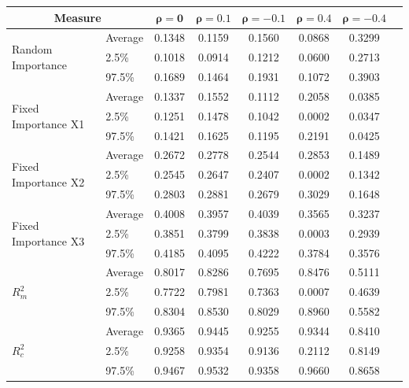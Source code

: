 \begin{table}[H]
  \centering
  \begin{tabular}{@{}llcccccc@{}}
    \toprule
    \multicolumn{2}{c}{\textbf{Measure}} & $\mathbf{\rho=0}$ & $\mathbf{\rho=0.1}$ & $\mathbf{\rho=-0.1}$ & $\mathbf{\rho=0.4}$ & $\mathbf{\rho=-0.4}$ \\ \midrule
    \multirow{3}{*}{Random Importance} & Average & 0.1348 & 0.1159 & 0.1560 & 0.0868 & 0.3299 \\
                                       & 2.5\%   & 0.1018 & 0.0914 & 0.1212 & 0.0600 & 0.2713 \\
                                       & 97.5\%  & 0.1689 & 0.1464 & 0.1931 & 0.1072 & 0.3903 \\ \midrule
    \multirow{3}{*}{Fixed Importance X1} & Average & 0.1337 & 0.1552 & 0.1112 & 0.2058 & 0.0385 \\
                                         & 2.5\%   & 0.1251 & 0.1478 & 0.1042 & 0.0002 & 0.0347 \\
                                         & 97.5\%  & 0.1421 & 0.1625 & 0.1195 & 0.2191 & 0.0425 \\ \midrule
    \multirow{3}{*}{Fixed Importance X2} & Average & 0.2672 & 0.2778 & 0.2544 & 0.2853 & 0.1489 \\
                                         & 2.5\%   & 0.2545 & 0.2647 & 0.2407 & 0.0002 & 0.1342 \\
                                         & 97.5\%  & 0.2803 & 0.2881 & 0.2679 & 0.3029 & 0.1648 \\ \midrule
    \multirow{3}{*}{Fixed Importance X3} & Average & 0.4008 & 0.3957 & 0.4039 & 0.3565 & 0.3237 \\
                                         & 2.5\%   & 0.3851 & 0.3799 & 0.3838 & 0.0003 & 0.2939 \\
                                         & 97.5\%  & 0.4185 & 0.4095 & 0.4222 & 0.3784 & 0.3576 \\ \midrule
    \multirow{3}{*}{$R^2_m$}            & Average & 0.8017 & 0.8286 & 0.7695 & 0.8476 & 0.5111 \\
                                         & 2.5\%   & 0.7722 & 0.7981 & 0.7363 & 0.0007 & 0.4639 \\
                                         & 97.5\%  & 0.8304 & 0.8530 & 0.8029 & 0.8960 & 0.5582 \\ \midrule
    \multirow{3}{*}{$R^2_c$}            & Average & 0.9365 & 0.9445 & 0.9255 & 0.9344 & 0.8410 \\
                                         & 2.5\%   & 0.9258 & 0.9354 & 0.9136 & 0.2112 & 0.8149 \\
                                         & 97.5\%  & 0.9467 & 0.9532 & 0.9358 & 0.9660 & 0.8658 \\ \bottomrule
    \end{tabular}
    

\end{table}
